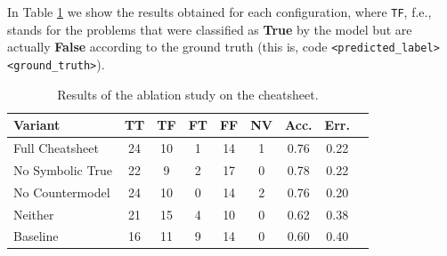 \documentclass{article}
\begin{document}
In Table \ref{fig:ablation_results} we show the results obtained for each configuration, where \texttt{TF}, f.e., stands for the problems that were classified as \textbf{True} by the model but are actually \textbf{False} according to the ground truth (this is, code \texttt{<predicted\_label><ground\_truth>}).

\begin{table}[H]
  \centering
  \begin{tabular}{lcccccccc}
    \toprule
    \textbf{Variant} & \textbf{TT} & \textbf{TF} & \textbf{FT} & \textbf{FF} & \textbf{NV} & \textbf{Acc.} & \textbf{Err.} \\
    \midrule
    Full Cheatsheet  & 24          & 10          & 1           & 14          & 1           & 0.76          & 0.22          \\
    No Symbolic True & 22          & 9           & 2           & 17          & 0           & 0.78          & 0.22          \\
    No Countermodel  & 24          & 10          & 0           & 14          & 2           & 0.76          & 0.20          \\
    Neither          & 21          & 15          & 4           & 10          & 0           & 0.62          & 0.38          \\
    Baseline         & 16          & 11          & 9           & 14          & 0           & 0.60          & 0.40          \\
    \bottomrule
  \end{tabular}
  \vspace{0.5em}
  \caption{Results of the ablation study on the cheatsheet.}
  \label{fig:ablation_results}
\end{table}
\end{document}
